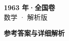\documentclass[zihao=-4, a4paper]{ctexart}
\begin{document}
\begin{center}
  {\Large\bfseries 1963 年·全国卷}\\[4pt]
  {\large 数学 · 解析版}
\end{center}
\medskip
{}

\clearpage
{}
\begin{center}{\Large\bfseries 参考答案与详细解析}\end{center}
\medskip

\end{document}
